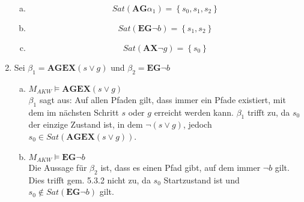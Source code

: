 \documentclass[a4paper]{scrartcl}
\begin{document}
\begin{enumerate}
\begin{enumerate}[(a)]
            \item
                \begin{equation}
                    Sat(\textbf{AG}\alpha_1) = \left\{ s_0, s_1, s_2 \right\}
                \end{equation}

            \item
                \begin{equation}
                    Sat(\textbf{EG} \lnot b) = \left\{ s_1, s_2 \right\}
                \end{equation}

            \item
                \begin{equation}
                    Sat(\textbf{AX} \lnot g) = \left\{ s_0 \right\}
                \end{equation}

        \end{enumerate}

    \item Sei $\beta_1=\textbf{AGEX}(s\vee g)$ und $\beta_2=\textbf{EG}\neg b$
        \begin{enumerate}[(a)]
            \item $M_{AKW}\models\textbf{AGEX}(s\vee g)$ \\
                $\beta_1$ sagt aus: Auf allen Pfaden gilt, dass immer ein Pfade
                existiert, mit dem im nächsten Schritt $s$ oder $g$ erreicht
                werden kann.
                $\beta_1$ trifft zu, da $s_0$ der einzige Zustand ist, in dem
                $\neg(s\vee g)$, jedoch $s_0\in Sat(\textbf{AGEX}(s\vee g))$.

            \item $M_{AKW}\models\textbf{EG}\neg b$ \\
                Die Aussage für $\beta_2$ ist, dass es einen Pfad gibt, auf dem
                immer $\neg b$ gilt.
                Dies trifft gem. 5.3.2 nicht zu, da $s_0$ Startzustand ist und
                $s_0\notin Sat(\textbf{EG}\neg b)$ gilt.

        \end{enumerate}


\end{enumerate}
\end{document}

